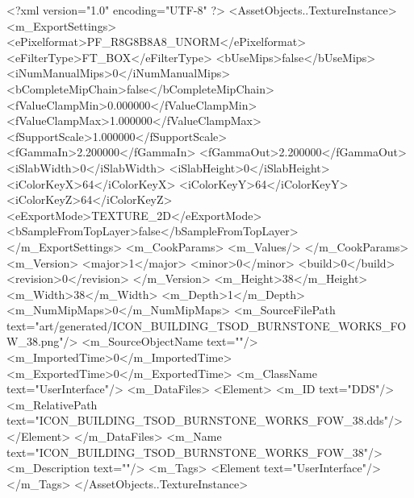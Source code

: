 <?xml version="1.0" encoding="UTF-8" ?>
<AssetObjects..TextureInstance>
	<m_ExportSettings>
		<ePixelformat>PF_R8G8B8A8_UNORM</ePixelformat>
		<eFilterType>FT_BOX</eFilterType>
		<bUseMips>false</bUseMips>
		<iNumManualMips>0</iNumManualMips>
		<bCompleteMipChain>false</bCompleteMipChain>
		<fValueClampMin>0.000000</fValueClampMin>
		<fValueClampMax>1.000000</fValueClampMax>
		<fSupportScale>1.000000</fSupportScale>
		<fGammaIn>2.200000</fGammaIn>
		<fGammaOut>2.200000</fGammaOut>
		<iSlabWidth>0</iSlabWidth>
		<iSlabHeight>0</iSlabHeight>
		<iColorKeyX>64</iColorKeyX>
		<iColorKeyY>64</iColorKeyY>
		<iColorKeyZ>64</iColorKeyZ>
		<eExportMode>TEXTURE_2D</eExportMode>
		<bSampleFromTopLayer>false</bSampleFromTopLayer>
	</m_ExportSettings>
	<m_CookParams>
		<m_Values/>
	</m_CookParams>
	<m_Version>
		<major>1</major>
		<minor>0</minor>
		<build>0</build>
		<revision>0</revision>
	</m_Version>
	<m_Height>38</m_Height>
	<m_Width>38</m_Width>
	<m_Depth>1</m_Depth>
	<m_NumMipMaps>0</m_NumMipMaps>
	<m_SourceFilePath text="art/generated/ICON_BUILDING_TSOD_BURNSTONE_WORKS_FOW_38.png"/>
	<m_SourceObjectName text=""/>
	<m_ImportedTime>0</m_ImportedTime>
	<m_ExportedTime>0</m_ExportedTime>
	<m_ClassName text="UserInterface"/>
	<m_DataFiles>
		<Element>
			<m_ID text="DDS"/>
			<m_RelativePath text="ICON_BUILDING_TSOD_BURNSTONE_WORKS_FOW_38.dds"/>
		</Element>
	</m_DataFiles>
	<m_Name text="ICON_BUILDING_TSOD_BURNSTONE_WORKS_FOW_38"/>
	<m_Description text=""/>
	<m_Tags>
		<Element text="UserInterface"/>
	</m_Tags>
</AssetObjects..TextureInstance>
